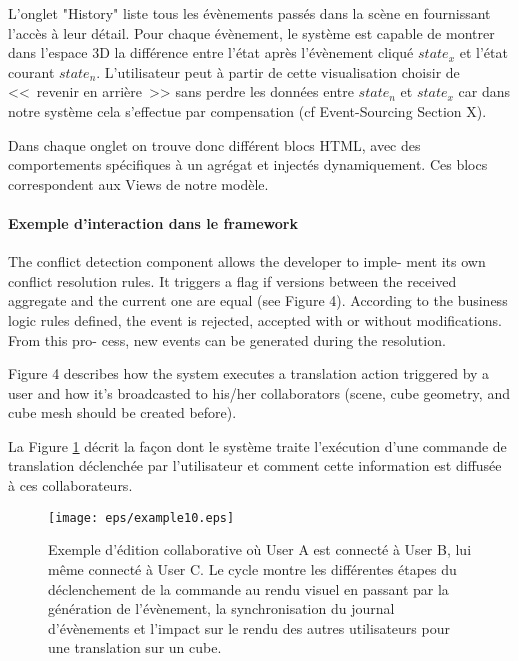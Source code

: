 L'onglet "History" liste tous les évènements passés dans la scène en fournissant 
l'accès à leur détail. Pour chaque évènement, le système est capable de montrer 
dans l'espace 3D la différence entre l'état  après l'évènement cliqué $state_x$ et 
l'état courant $state_n$. L'utilisateur peut à partir de cette visualisation choisir de 
<<~revenir en arrière~>> sans perdre les données entre $state_n$ et $state_x$ 
car dans notre système cela s'effectue par compensation (cf Event-Sourcing 
Section X).

Dans chaque onglet on trouve donc différent blocs \gls{HTML}, avec des 
comportements spécifiques à un agrégat et injectés dynamiquement. Ces blocs 
correspondent aux Views de notre modèle.
\paragraph{Exemple d'interaction dans le framework}
The conflict detection component allows the developer to imple- ment its own 
conflict resolution rules. It triggers a flag if versions between the received 
aggregate and the current one are equal (see Figure 4). According to the business 
logic rules defined, the event is rejected, accepted with or without modifications. 
From this pro- cess, new events can be generated during the resolution.

Figure 4 describes how the system executes a translation action triggered by a 
user and how it’s broadcasted to his/her collaborators (scene, cube geometry, and 
cube mesh should be created before). 

La Figure \ref{fig:cqrs-example} décrit la façon dont le système traite l'exécution 
d'une commande de translation déclenchée par l'utilisateur et comment cette 
information est diffusée à ces collaborateurs.
\begin{figure}[ht]
	\centering
	\texttt{[image: eps/example10.eps]}
	\caption[Flux de la collaboration dans le framework 3DEvent entre 3 
	utilisateurs]{Exemple d'édition collaborative où User A est connecté à User  B, 
		lui 
		même connecté à User C. Le cycle montre les différentes étapes du 
		déclenchement de la commande au rendu visuel en passant par la 
		génération 
		de l'évènement, la 
		synchronisation du journal d'évènements et l'impact sur le rendu des autres 
		utilisateurs pour une translation sur un cube.}\label{fig:cqrs-example}
\end{figure}
